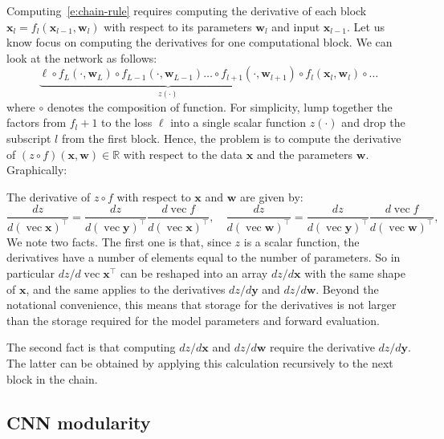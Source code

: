 \documentclass[12pt]{article}
\newcommand{\real}{\mathbb{R}}
\newcommand{\vv}{\operatorname{vec}}
\newcommand{\bx}{\mathbf{x}}
\newcommand{\by}{\mathbf{y}}
\newcommand{\bw}{\mathbf{w}}
\begin{document}
Computing~\eqref{e:chain-rule} requires computing the derivative of each block $\bx_l = f_l(\bx_{l-1},\bw_l)$ with respect to its parameters $\bw_l$ and input $\bx_{l-1}$. Let us know focus on computing the derivatives for one computational block. We can look at the network as follows:
\[
    \underbrace{
    \ell \circ f_{L}(\cdot,\bw_L)
     \circ f_{L-1}(\cdot,\bw_{L-1})
     \dots
     \circ f_{l+1}(\cdot,\bw_{l+1})
     }_{\displaystyle z(\cdot)}
     \circ f_{l}(\bx_l,\bw_{l})
     \circ \dots
\]
where $\circ$ denotes the composition of function. For simplicity, lump together the factors from $f_l+1$ to the loss $\ell$ into a single scalar function $z(\cdot)$ and drop the subscript $l$ from the first block. Hence, the problem is to compute the derivative of $(z \circ f)(\bx,\bw) \in \real$ with respect to the data $\bx$ and the parameters $\bw$. Graphically:
\begin{center}
\end{center}
The derivative of $z \circ f$ with respect to $\bx$ and $\bw$ are given by:
\[
\frac{dz}{d(\vv \bx)^\top}
=
\frac{dz}{d(\vv \by)^\top}
\frac{d\vv f}{d(\vv \bx)^\top},
\quad
\frac{dz}{d(\vv \bw)^\top}
=
\frac{dz}{d(\vv \by)^\top}
\frac{d\vv f}{d(\vv \bw)^\top},
\]
We note two facts. The first one is that, since $z$ is a scalar function, the derivatives have a number of elements equal to the number of parameters. So in particular $dz/d\vv \bx^\top$ can be reshaped into an array $dz/d\bx$ with the same shape of $\bx$, and the same applies to the derivatives $dz/d\by$ and $dz/d\bw$. Beyond the notational convenience, this means that storage for the derivatives is not larger than the storage required for the model parameters and forward evaluation.

The second fact is that computing $dz/d\bx$ and $dz/d\bw$ require the derivative $dz/d\by$. The latter can be obtained by applying this calculation recursively to the next block in the chain.

\subsection{CNN modularity}\label{s:modularity}
\end{document}
